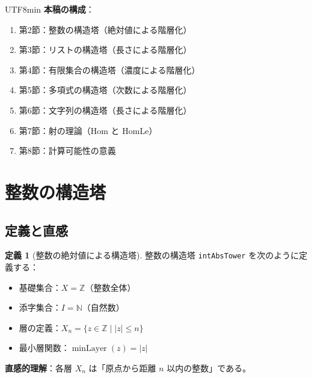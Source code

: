 \documentclass[12pt,a4paper]{article}
\theoremstyle{definition}
\newtheorem{definition}[theorem]{定義}
\theoremstyle{remark}
\newcommand{\N}{\mathbb{N}}
\newcommand{\Z}{\mathbb{Z}}
\DeclareMathOperator{\minLayer}{minLayer}
\begin{document}
\begin{CJK}{UTF8}{min}
\textbf{本稿の構成}：
\begin{enumerate}
\item 第2節：整数の構造塔（絶対値による階層化）
\item 第3節：リストの構造塔（長さによる階層化）
\item 第4節：有限集合の構造塔（濃度による階層化）
\item 第5節：多項式の構造塔（次数による階層化）
\item 第6節：文字列の構造塔（長さによる階層化）
\item 第7節：射の理論（Hom と HomLe）
\item 第8節：計算可能性の意義
\end{enumerate}

\section{整数の構造塔}

\subsection{定義と直感}

\begin{definition}[整数の絶対値による構造塔]
整数の構造塔 \texttt{intAbsTower} を次のように定義する：
\begin{itemize}
\item 基礎集合：$X = \Z$（整数全体）
\item 添字集合：$I = \N$（自然数）
\item 層の定義：$X_n = \{z \in \Z \mid |z| \leq n\}$
\item 最小層関数：$\minLayer(z) = |z|$
\end{itemize}
\end{definition}

\textbf{直感的理解}：各層 $X_n$ は「原点から距離 $n$ 以内の整数」である。

\begin{center}
\end{center}
\end{CJK}
\end{document}

